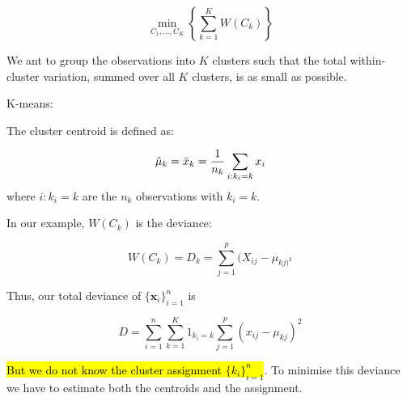 \documentclass[11pt]{article}
\begin{document}
\begin{equation*}
    \underset{C_1, \ldots, C_K}{\min}\left\{\sum_{k=1}^K W(C_k)\right\}
\end{equation*}

We ant to group the observations into $K$ clusters such that the total within-cluster variation, summed over all $K$ clusters, is as small as possible. %

\begin{algo}
    K-means:

    \begin{center}
\end{center}
\end{algo}

The cluster centroid is defined as:

\begin{equation*}
    \hat{\mu}_k = \Bar{x}_k = \dfrac{1}{n_k}\sum_{i:k_i = k}x_i
\end{equation*}
where $i: k_i = k$ are the $n_k$ observations with $k_i = k$.

In our example, $W(C_k)$ is the deviance:

\begin{equation*}
    W(C_k) = D_k = \sum_{j=1}^p (X_{ij} - \mu_{kj)^2}
\end{equation*}

Thus, our total deviance of $\{\mathbf{x}_i\}_{i=1}^n$ is 

\begin{equation*}
    D = \sum_{i=1}^n \sum_{k=1}^K 1_{k_i = k} \sum_{j=1}^p (x_{ij} - \mu_{kj})^2
\end{equation*}

\hl{But we do not know the cluster assignment $\{k_i\}_{i=1}^n$}. To minimise this deviance we have to estimate both the centroids and the assignment.
\end{document}
